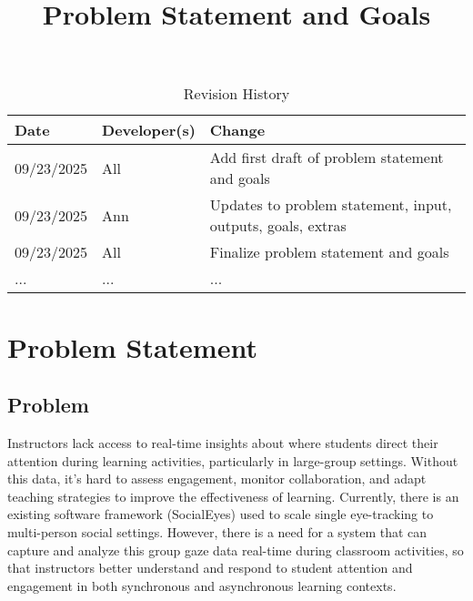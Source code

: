 \documentclass{article}
\title{Problem Statement and Goals\\\progname}
\author{\authname}
\date{}
\begin{document}
\maketitle

\begin{table}[hp]
\caption{Revision History} \label{TblRevisionHistory}
\begin{tabularx}{\textwidth}{llX}
\toprule
\textbf{Date} & \textbf{Developer(s)} & \textbf{Change}\\
\midrule
09/23/2025 & All & Add first draft of problem statement and goals\\
09/23/2025 & Ann & Updates to problem statement, input, outputs, goals, extras\\
09/23/2025 & All & Finalize problem statement and goals\\
... & ... & ...\\
\bottomrule
\end{tabularx}
\end{table}

\section{Problem Statement}
\subsection{Problem}
Instructors lack access to real-time insights about where students direct their attention during learning activities, particularly in large-group settings. Without this data, it's hard to assess engagement, monitor collaboration, and adapt teaching strategies to improve the effectiveness of learning. Currently, there is an existing software framework (SocialEyes) used to scale single eye-tracking to multi-person social settings. However, there is a need for a system that can capture and analyze this group gaze data real-time during classroom activities, so that instructors better understand and respond to student attention and engagement in both synchronous and asynchronous learning contexts. 
\end{document}
